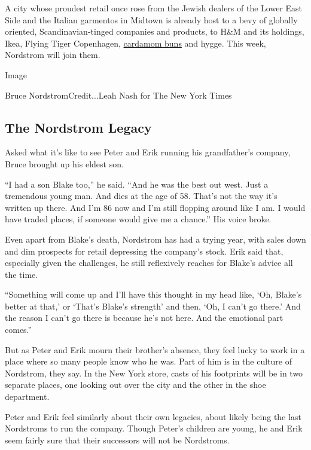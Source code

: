 A city whose proudest retail once rose from the Jewish dealers of the
Lower East Side and the Italian garmentos in Midtown is already host to
a bevy of globally oriented, Scandinavian-tinged companies and products,
to H\&M and its holdings, Ikea, Flying Tiger Copenhagen,
\href{https://cooking.nytimes3xbfgragh.onion/recipes/1020437-swedish-cardamom-buns}{cardamom
buns} and hygge. This week, Nordstrom will join them.

Image

Bruce NordstromCredit...Leah Nash for The New York Times

\hypertarget{the-nordstrom-legacy}{%
\subsection{The Nordstrom Legacy}\label{the-nordstrom-legacy}}

Asked what it's like to see Peter and Erik running his grandfather's
company, Bruce brought up his eldest son.

``I had a son Blake too,'' he said. ``And he was the best out west. Just
a tremendous young man. And dies at the age of 58. That's not the way
it's written up there. And I'm 86 now and I'm still flopping around like
I am. I would have traded places, if someone would give me a chance.''
His voice broke.

Even apart from Blake's death, Nordstrom has had a trying year, with
sales down and dim prospects for retail depressing the company's stock.
Erik said that, especially given the challenges, he still reflexively
reaches for Blake's advice all the time.

``Something will come up and I'll have this thought in my head like,
`Oh, Blake's better at that,' or `That's Blake's strength' and then,
`Oh, I can't go there.' And the reason I can't go there is because he's
not here. And the emotional part comes.''

But as Peter and Erik mourn their brother's absence, they feel lucky to
work in a place where so many people know who he was. Part of him is in
the culture of Nordstrom, they say. In the New York store, casts of his
footprints will be in two separate places, one looking out over the city
and the other in the shoe department.

Peter and Erik feel similarly about their own legacies, about likely
being the last Nordstroms to run the company. Though Peter's children
are young, he and Erik seem fairly sure that their successors will not
be Nordstroms.

